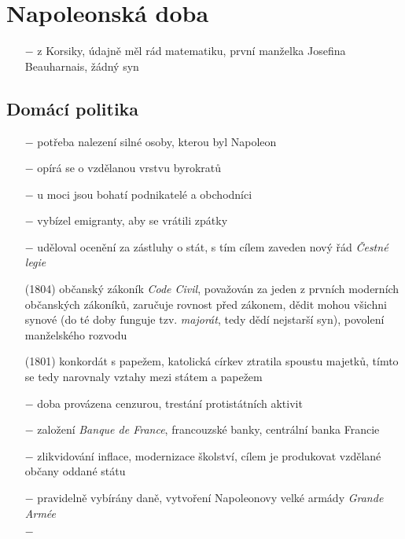 \documentclass{article}
\begin{document}
\section*{Napoleonská doba}
\begin{itemize}
    \vspace{-0.5em}
    \setlength\itemsep{0.15em}
    \item[$-$] z Korsiky, údajně měl rád matematiku, první manželka Josefina Beauharnais, žádný syn
\end{itemize}

\subsection*{Domácí politika}
\begin{itemize}
    \vspace{-0.5em}
    \setlength\itemsep{0.15em}
    \item[$-$] potřeba nalezení silné osoby, kterou byl Napoleon
    \item[$-$] opírá se o vzdělanou vrstvu byrokratů
    \item[$-$] u moci jsou bohatí podnikatelé a obchodníci
    \item[$-$] vybízel emigranty, aby se vrátili zpátky
    \item[$-$] uděloval ocenění za zástluhy o stát, s tím cílem zaveden nový řád \textit{Čestné legie}
    \item[(1804)] občanský zákoník \textit{Code Civil}, považován za jeden z prvních moderních občanských zákoníků, zaručuje rovnost před zákonem, dědit mohou všichni synové (do té doby funguje tzv. \textit{majorát}, tedy dědí nejstarší syn), povolení manželského rozvodu
    \item[(1801)] konkordát s papežem, katolická církev ztratila spoustu majetků, tímto se tedy narovnaly vztahy mezi státem a papežem
    \item[$-$] doba provázena cenzurou, trestání protistátních aktivit
    \item[$-$] založení \textit{Banque de France}, francouzské banky, centrální banka Francie
    \item[$-$] zlikvidování inflace, modernizace školství, cílem je produkovat vzdělané občany oddané státu
    \item[$-$] pravidelně vybírány daně, vytvoření Napoleonovy velké armády \textit{Grande Armée}
    \item[$-$] 
\end{itemize}
\end{document}
